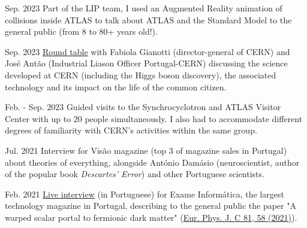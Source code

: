 
\begin{cventries}
    


    {}{Sep. 2023}
    {Part of the LIP team, I used an Augmented Reality animation of collisions inside ATLAS to talk about ATLAS and the Standard Model to the general public (from 8 to 80+ years old!).} 

    {}{Sep. 2023}
    {\href{https://www.cienciaviva.pt/divulgacao-cientifica/o-bosao-de-higgs-e-as-nossas-vidas}{Round table} with Fabiola Gianotti (director-general of CERN) and José Antão (Industrial Liason Officer Portugal-CERN) discussing the science developed at CERN (including the Higgs boson discovery), the associated technology and its impact on the life of the common citizen.}

    {}{Feb. - Sep. 2023}
    {Guided visits to the Synchrocyclotron and ATLAS Visitor Center with up to 20 people simultaneously. I also had to accommodate different degrees of familiarity with CERN's activities within the same group.}

    {}{Jul. 2021}
    {Interview for Visão magazine (top 3 of magazine sales in Portugal) about theories of everything, alongside António Damásio (neuroscientist, author of the popular book \textit{Descartes' Error}) and other Portuguese scientists.}


    {}{Feb. 2021}
    {\href{https://visao.pt/exameinformatica/videos-ei/eilive/2021-02-08-cromo-da-semana-novas-particulas-atomicas-e-a-quinta-dimensao/}{Live interview} (in Portuguese) for Exame Informática, the largest technology magazine in Portugal, describing to the general public the paper "A warped scalar portal to fermionic dark matter" (\href{https://doi.org/10.1140/epjc/s10052-021-08851-0}{Eur. Phys. J. C 81, 58 (2021)}). }


\end{cventries}
